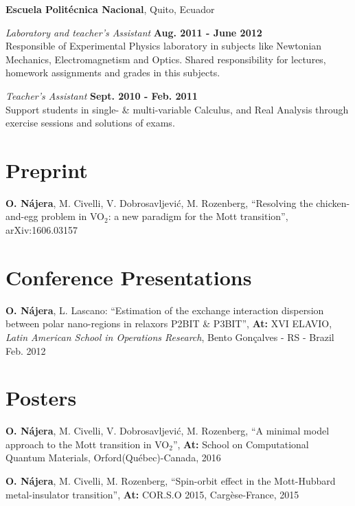\documentclass[margin,line]{res}
\newenvironment{list1}{
  \begin{list}{\ding{113}}{%
      \setlength{\itemsep}{0in}
      \setlength{\parsep}{0in} \setlength{\parskip}{0in}
      \setlength{\topsep}{0in} \setlength{\partopsep}{0in}
      \setlength{\leftmargin}{0.17in}}}{\end{list}}
\begin{document}
\begin{resume}
  {\bf Escuela Politécnica Nacional}, Quito, Ecuador
  \begin{list1}
   \item[] {\em Laboratory and teacher's Assistant} \hfill {\bf Aug. 2011 - June 2012}\\
    Responsible of Experimental Physics laboratory in subjects
    like Newtonian Mechanics, Electromagnetism and Optics.
    Shared responsibility for lectures, homework assignments and grades in this subjects.\\
   \item[] {\em Teacher's Assistant} \hfill {\bf Sept. 2010 - Feb. 2011}\\
    Support students in single- \& multi-variable Calculus, and Real Analysis through
    exercise sessions and solutions of exams.
  \end{list1}

\section{\sc Preprint}
{\bf O. Nájera}, M. Civelli, V. Dobrosavljevi\'c, M. Rozenberg, ``Resolving the chicken-and-egg problem in VO$_2$: a new paradigm for the Mott transition'', arXiv:1606.03157

\section{\sc Conference Presentations}
  {\bf O. Nájera}, L. Lascano: ``Estimation of the exchange interaction dispersion between polar
  nano-regions in relaxors P2BIT \& P3BIT'', {\bf At:} XVI ELAVIO, {\em Latin
American School in Operations Research}, Bento Gonçalves - RS - Brazil Feb. 2012

\section{\sc Posters}
{\bf O. Nájera}, M. Civelli, V. Dobrosavljevi\'c, M. Rozenberg, ``A
minimal model approach to the Mott transition in VO$_2$'', {\bf At:}
School on Computational Quantum Materials, Orford(Québec)-Canada, 2016

{\bf O. Nájera}, M. Civelli, M. Rozenberg, ``Spin-orbit effect in the
Mott-Hubbard metal-insulator transition'', {\bf At:} COR.S.O 2015,
Cargèse-France, 2015


\end{resume}
\end{document}
